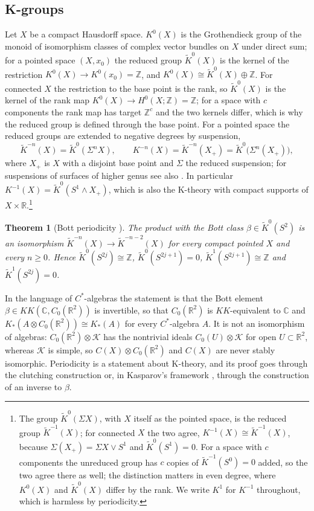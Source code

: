 \documentclass[reqno,11pt]{amsart}
\newtheorem{theorem}{Theorem}[section]
\theoremstyle{definition}
\newcommand{\ZZ}{\mathbb{Z}}
\newcommand{\RR}{\mathbb{R}}
\newcommand{\CC}{\mathbb{C}}
\newcommand{\KK}{K\!K}
\begin{document}
\subsection{K-groups}
Let $X$ be a compact Hausdorff space. $K^0(X)$ is the Grothendieck group of the monoid of isomorphism classes of complex vector bundles on $X$ under direct sum; for a pointed space $(X,x_0)$ the reduced group $\widetilde K^0(X)$ is the kernel of the restriction $K^0(X)\to K^0(x_0)=\ZZ$, and $K^0(X)\cong\widetilde K^0(X)\oplus\ZZ$. For connected $X$ the restriction to the base point is the rank, so $\widetilde K^0(X)$ is the kernel of the rank map $K^0(X)\to H^0(X;\ZZ)=\ZZ$; for a space with $c$ components the rank map has target $\ZZ^c$ and the two kernels differ, which is why the reduced group is defined through the base point. For a pointed space the reduced groups are extended to negative degrees by suspension,
\begin{equation}\label{eq:K1}
\widetilde K^{-n}(X)=\widetilde K^0(\Sigma^nX),\qquad K^{-n}(X)=\widetilde K^{-n}(X_+)=\widetilde K^0\bigl(\Sigma^n(X_+)\bigr),
\end{equation}
where $X_+$ is $X$ with a disjoint base point and $\Sigma$ the reduced suspension; for suspensions of surfaces of higher genus see also \cite{Bha22a}. In particular $K^{-1}(X)=\widetilde K^0(S^1\wedge X_+)$, which is also the K-theory with compact supports of $X\times\RR$.\footnote{The group $\widetilde K^0(\Sigma X)$, with $X$ itself as the pointed space, is the reduced group $\widetilde K^{-1}(X)$; for connected $X$ the two agree, $K^{-1}(X)\cong\widetilde K^{-1}(X)$, because $\Sigma(X_+)=\Sigma X\vee S^1$ and $\widetilde K^0(S^1)=0$. For a space with $c$ components the unreduced group has $c$ copies of $\widetilde K^{-1}(S^0)=0$ added, so the two agree there as well; the distinction matters in even degree, where $K^0(X)$ and $\widetilde K^0(X)$ differ by the rank. We write $K^1$ for $K^{-1}$ throughout, which is harmless by periodicity.}

\begin{theorem}[Bott periodicity \cite{Ati67}]\label{thm:bott}
The product with the Bott class $\beta\in\widetilde K^0(S^2)$ is an isomorphism $\widetilde K^{-n}(X)\to\widetilde K^{-n-2}(X)$ for every compact pointed $X$ and every $n\ge0$. Hence $\widetilde K^0(S^{2j})\cong\ZZ$, $\widetilde K^0(S^{2j+1})=0$, $\widetilde K^{1}(S^{2j+1})\cong\ZZ$ and $\widetilde K^{1}(S^{2j})=0$.
\end{theorem}

In the language of $C^*$-algebras the statement is that the Bott element $\beta\in\KK(\CC,C_0(\RR^2))$ is invertible, so that $C_0(\RR^2)$ is $\KK$-equivalent to $\CC$ and $K_*(A\otimes C_0(\RR^2))\cong K_*(A)$ for every $C^*$-algebra $A$. It is not an isomorphism of algebras: $C_0(\RR^2)\otimes\mathcal K$ has the nontrivial ideals $C_0(U)\otimes\mathcal K$ for open $U\subset\RR^2$, whereas $\mathcal K$ is simple, so $C(X)\otimes C_0(\RR^2)$ and $C(X)$ are never stably isomorphic. Periodicity is a statement about K-theory, and its proof \cite{Ati67} goes through the clutching construction or, in Kasparov's framework \cite{Kas81}, through the construction of an inverse to $\beta$.
\end{document}
